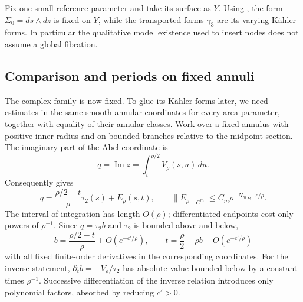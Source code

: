Fix one small reference parameter and take its surface as \(Y\).
Using , the form
\(\Sigma_0=ds\wedge dz\) is fixed on \(Y\), while the transported
forms \(\gamma_3\) are its varying K\"ahler forms.
In particular the qualitative model existence used to insert
nodes does not assume a global fibration.

\subsection{Comparison and periods on fixed annuli}

The complex family is now fixed.  To glue its K\"ahler forms later,
we need estimates in the same smooth annular coordinates for every
area parameter, together with equality of their annular classes.
Work over a fixed annulus with positive inner radius and on
bounded branches relative to the midpoint section.  The imaginary
part of the Abel coordinate is
\begin{equation}\label{eq:nodal-q-coordinate}
 q=\operatorname{Im}z=\int_t^{\rho/2}V_\rho(s,u)\,du.
\end{equation}
Consequently  gives
\begin{equation}\label{eq:nodal-q-tail}
 q=\frac{\rho/2-t}{\rho}\tau_2(s)+E_\rho(s,t),\qquad
 \|E_\rho\|_{C^m}\le C_m\rho^{-N_m}e^{-c/\rho}.
\end{equation}
The interval of integration has length \(O(\rho)\); differentiated
endpoints cost only powers of \(\rho^{-1}\).
Since \(q=\tau_2b\) and \(\tau_2\) is bounded above and below,
\begin{equation}\label{eq:nodal-inverse-t}
 b=\frac{\rho/2-t}{\rho}+O(e^{-c'/\rho}),\qquad
 t=\frac{\rho}{2}-\rho b+O(e^{-c'/\rho})
\end{equation}
with all fixed finite-order derivatives in the corresponding
coordinates.  For the inverse statement,
\(\partial_tb=-V_\rho/\tau_2\) has absolute value bounded below
by a constant times \(\rho^{-1}\).  Successive differentiation
of the inverse relation introduces only polynomial factors,
absorbed by reducing \(c'>0\).

